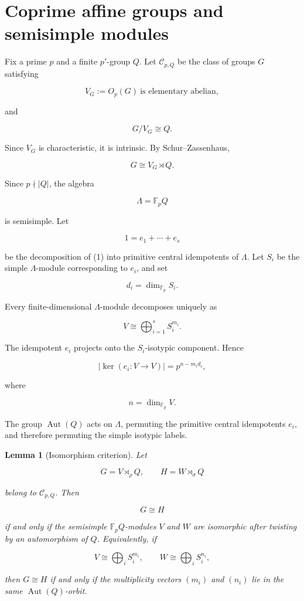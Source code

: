 \documentclass[11pt]{article}
\newtheorem{lemma}[theorem]{Lemma}
\begin{document}
\section{Coprime affine groups and semisimple modules}

Fix a prime $p$ and a finite $p'$-group $Q$. Let $\mathcal C_{p,Q}$ be the class of groups $G$ satisfying

\[
V_G:=O_p(G)\ \text{is elementary abelian},
\]

and

\[
G/V_G\cong Q.
\]

Since $V_G$ is characteristic, it is intrinsic. By Schur--Zassenhaus,

\[
G\cong V_G\rtimes Q.
\]

Since $p\nmid |Q|$, the algebra

\[
\Lambda=\mathbb F_pQ
\]

is semisimple. Let

\[
1=e_1+\cdots+e_s
\]

be the decomposition of (1) into primitive central idempotents of $\Lambda$. Let $S_i$ be the simple $\Lambda$-module corresponding to $e_i$, and set

\[
d_i=\dim_{\mathbb F_p}S_i.
\]

Every finite-dimensional $\Lambda$-module decomposes uniquely as

\[
V\cong
\bigoplus_{i=1}^{s}S_i^{m_i}.
\]

The idempotent $e_i$ projects onto the $S_i$-isotypic component. Hence

\[
|\ker(e_i:V\to V)|
=p^{n-m_id_i},
\]

where

\[
n=\dim_{\mathbb F_p}V.
\]

The group $\operatorname{Aut}(Q)$ acts on $\Lambda$, permuting the primitive central idempotents $e_i$, and therefore permuting the simple isotypic labels.

\begin{lemma}[Isomorphism criterion]
Let

\[
G=V\rtimes_\rho Q,
\qquad
H=W\rtimes_\sigma Q
\]

belong to $\mathcal C_{p,Q}$. Then

\[
G\cong H
\]

if and only if the semisimple $\mathbb F_pQ$-modules $V$ and $W$ are isomorphic after twisting by an automorphism of $Q$. Equivalently, if

\[
V\cong\bigoplus_i S_i^{m_i},
\qquad
W\cong\bigoplus_i S_i^{n_i},
\]

then $G\cong H$ if and only if the multiplicity vectors $(m_i)$ and $(n_i)$ lie in the same $\operatorname{Aut}(Q)$-orbit.

\end{lemma}
\end{document}
